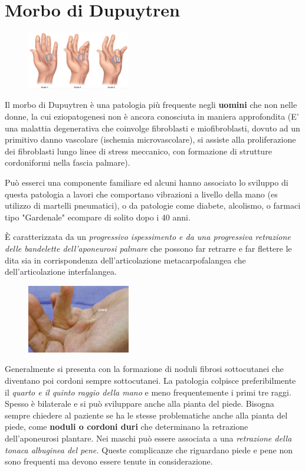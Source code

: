 \section{Morbo di Dupuytren}

\begin{figure}[!ht]
\centering
\includegraphics[width=0.4\textwidth]{005/image1.jpeg}
\end{figure}

Il morbo di Dupuytren è una patologia più frequente negli \textbf{uomini} che non nelle donne, la cui eziopatogenesi non è ancora conosciuta in maniera approfondita (E' una malattia degenerativa che coinvolge fibroblasti e miofibroblasti, dovuto ad un primitivo danno vascolare (ischemia microvascolare), si assiste alla proliferazione dei fibroblasti lungo linee di stress meccanico, con formazione di strutture cordoniformi nella fascia palmare).

Può esserci una componente familiare ed alcuni hanno associato lo sviluppo di questa patologia a lavori che comportano vibrazioni a livello della mano (es utilizzo di martelli pneumatici), o da patologie
come diabete, alcolismo, o farmaci tipo "Gardenale" ecompare di solito dopo i 40 anni.

È caratterizzata da un \emph{progressivo ispessimento e da una progressiva retrazione delle bandelette dell'aponeurosi palmare} che possono far retrarre e far flettere le dita sia in corrispondenza dell'articolazione metacarpofalangea che dell'articolazione interfalangea.

\begin{figure}[!ht]
\centering
\includegraphics[width=0.4\textwidth]{005/image2.jpeg}
\end{figure}

Generalmente si presenta con la formazione di noduli fibrosi sottocutanei che diventano poi cordoni sempre sottocutanei. La patologia colpisce
preferibilmente il \emph{quarto e il quinto raggio della mano} e meno frequentemente i primi tre raggi. Spesso è bilaterale e si può sviluppare anche alla pianta del piede. Bisogna sempre chiedere al
paziente se ha le stesse problematiche anche alla pianta del piede, come \textbf{noduli o cordoni duri} che determinano la retrazione dell'aponeurosi plantare. Nei maschi può essere associata a una
\emph{retrazione della tonaca albuginea del pene.} Queste complicanze che riguardano piede e pene non sono frequenti ma devono essere tenute in considerazione.

